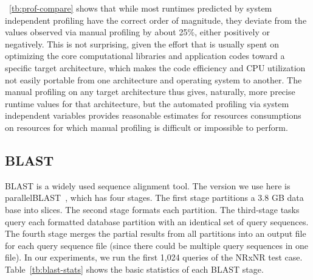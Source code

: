 \documentclass[preprint,12pt]{elsarticle}
\newcommand{\katznote}[1]{ {\textcolor{blue}    { ***Dan:   #1 }}}
\newcommand{\zhaonote}[1]{{\textcolor{darkgreen}{ ***Zhao:  #1 }}}
\newcommand{\katznote}[1]{}
\newcommand{\zhaonote}[1]{}
\begin{document}
\tablename~\ref{tb:prof-compare} shows that
while most runtimes predicted by system
independent profiling have the correct order of magnitude,
they deviate from the values observed via manual profiling by
about 25\%, either positively or negatively.  
This is not surprising, given the effort that is
usually spent on optimizing the core computational libraries and
application codes toward a specific target architecture, which makes
the code efficiency and CPU utilization not easily portable from one
architecture and operating system to another.  The manual
profiling on any target architecture thus gives, naturally, more
precise runtime values for that architecture, but the automated
profiling via system independent variables provides reasonable
estimates for resources consumptions on resources for which manual
profiling is difficult or impossible to perform. 



\subsection{BLAST}

BLAST is a widely used sequence alignment tool. The version we use here is parallelBLAST~\cite{ParallelBlast}, which has four stages. The first stage partitions a 3.8 GB data base into slices. The second stage formats each 
partition. The third-stage tasks query each formatted database partition with an identical set of query sequences. The
fourth stage merges the partial results from all partitions into an output file for each query sequence file 
(since there could be multiple query sequences in one file). %
%
%
In our experiments, we run the first 1,024 queries of the NRxNR test case. 
Table~\ref{tb:blast-stats}
shows the basic statistics of each BLAST stage. 
\end{document}
